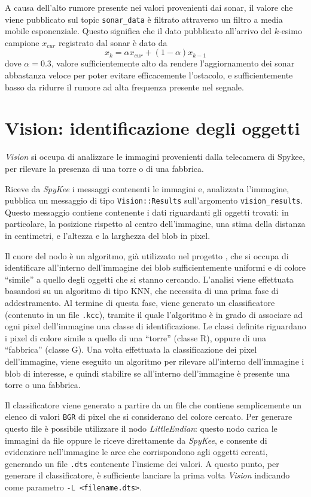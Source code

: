 A causa dell'alto rumore presente nei valori provenienti dai sonar, il valore che viene pubblicato sul topic \verb|sonar_data| è filtrato attraverso un filtro a media mobile esponenziale. Questo significa che il dato pubblicato all'arrivo del $k$-esimo campione $x_{cur}$ registrato dal sonar è dato da %
  \[ x_k = \alpha x_{cur} + (1 - \alpha) x_{k-1} \]
dove $\alpha = 0.3$, valore sufficientemente alto da rendere l'aggiornamento dei sonar abbastanza veloce per poter evitare efficacemente l'ostacolo, e sufficientemente basso da ridurre il rumore ad alta frequenza presente nel segnale.

\section{Vision: identificazione degli oggetti}

\emph{Vision} si occupa di analizzare le immagini provenienti dalla telecamera di Spykee, per rilevare la presenza di una torre o di una fabbrica. 

Riceve da \emph{SpyKee} i messaggi contenenti le immagini e, analizzata l'immagine, pubblica un messaggio di tipo \verb|Vision::Results| sull'argomento \verb|vision_results|. Questo messaggio contiene contenente i dati riguardanti gli oggetti trovati: in particolare, la posizione rispetto al centro dell'immagine, una stima della distanza in centimetri, e l'altezza e la larghezza del blob in pixel.

Il cuore del nodo è un algoritmo, già utilizzato nel progetto \cite{docmandelli}, che si occupa di identificare all'interno dell'immagine dei blob sufficientemente uniformi e di colore ``simile'' a quello degli oggetti che si stanno cercando. L'analisi viene effettuata basandosi su un algoritmo di tipo KNN, che necessita di una prima fase di addestramento. Al termine di questa fase, viene generato un classificatore (contenuto in un file \verb|.kcc|), tramite il quale l'algoritmo è in grado di associare ad ogni pixel dell'immagine una classe di identificazione. Le classi definite riguardano i pixel di colore simile a quello di una ``torre'' (classe R), oppure di una ``fabbrica'' (classe G). Una volta effettuata la classificazione dei pixel dell'immagine, viene eseguito un algoritmo per rilevare all'interno dell'immagine i blob di interesse, e quindi stabilire se all'interno dell'immagine è presente una torre o una fabbrica.

Il classificatore viene generato a partire da un file che contiene semplicemente un elenco di valori \verb|BGR| di pixel che si considerano del colore cercato. Per generare questo file è possibile utilizzare il nodo \emph{LittleEndian}: questo nodo carica le immagini da file oppure le riceve direttamente da \emph{SpyKee}, e consente di evidenziare nell'immagine le aree che corrispondono agli oggetti cercati, generando un file \verb|.dts| contenente l'insieme dei valori. A questo punto, per generare il classificatore, è sufficiente lanciare la prima volta \emph{Vision} indicando come parametro \verb|-L <filename.dts>|.

